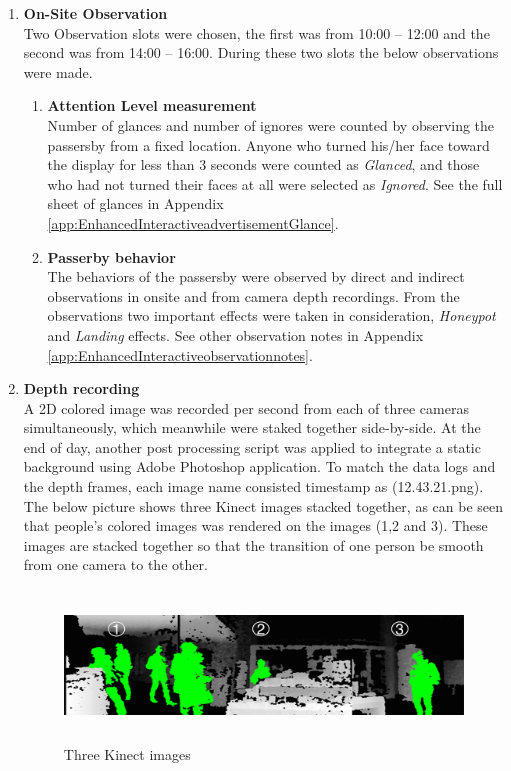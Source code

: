 \begin{enumerate}
\item \textbf{On-Site Observation} \\
Two Observation slots were chosen, the first was from 10:00 – 12:00 and the second was from 14:00 – 16:00. During these two slots the below observations were made.

\begin{enumerate}
\item \textbf{Attention Level measurement} \\
Number of glances and number of ignores were counted by observing the passersby from a fixed location. Anyone who turned his/her face toward the display for less than 3 seconds were counted as \emph{Glanced}, and those who had not turned their faces at all were selected as \emph{Ignored}. See the full sheet of glances in Appendix \ref{app:EnhancedInteractiveadvertisementGlance}.

\item \textbf{Passerby behavior} \\
The behaviors of the passersby were observed by direct and indirect observations in onsite and from camera depth recordings. From the observations two important effects were taken in consideration, \emph{Honeypot} and \emph{Landing} effects. See other observation notes in Appendix \ref{app:EnhancedInteractiveobservationnotes}.



\end{enumerate}

\item \textbf{Depth recording} \\
A 2D colored image was recorded per second from each of three cameras simultaneously, which meanwhile were staked together side-by-side. At the end of day, another post processing script was applied to integrate a static background using Adobe Photoshop application. To match the data logs and the depth frames, each image name consisted timestamp as (12.43.21.png).
The below picture shows three Kinect images stacked together, as can be seen that people's colored images was rendered on the images (1,2 and 3). These images are stacked together so that the transition of one person be smooth from one camera to the other.


\begin{minipage}{0.95\textwidth}
\begin{flushright}
\begin{figure}[H]
   \centering
    \includegraphics[width=\textwidth,height=40mm]{Figures/9/stacked_image}%
    \caption{Three Kinect images}%
    \label{fig:threekinectimages}%
\end{figure}
\end{flushright}
\end{minipage}



\end{enumerate}
